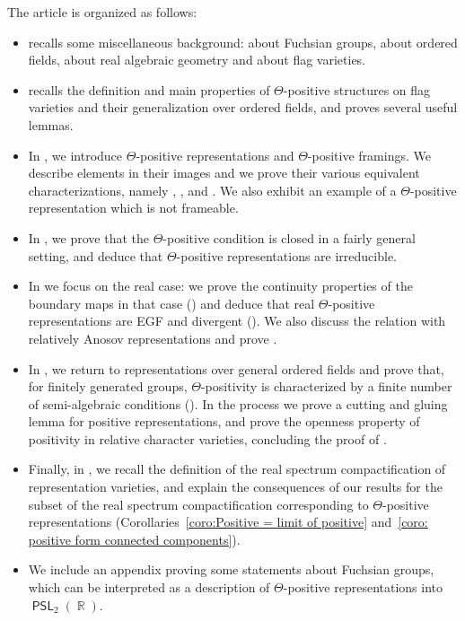 \documentclass{amsart}
\theoremstyle{plain}
\theoremstyle{definition}
\DeclareMathOperator{\PSL}{\mathsf{PSL}}
\DeclareMathOperator{\Rb}{{\mathbb{R}}}
\newcommand{\1}{\mathbf{1}}
\begin{document}
The article is organized as follows:
\begin{itemize}
    \item {} recalls some miscellaneous background: about Fuchsian groups, about ordered fields, about real algebraic geometry and about flag varieties.

    \item {} recalls the definition and main properties of $\Theta$-positive structures on flag varieties and their generalization over ordered fields, and proves several useful lemmas.

    \item In , we introduce $\Theta$-positive representations and $\Theta$-positive framings. We describe elements in their images and we prove their various equivalent characterizations, namely , , and . We also exhibit an example of a $\Theta$-positive representation which is not frameable.
   
    \item In , we prove that the $\Theta$-positive condition is closed in a fairly general setting, and deduce that $\Theta$-positive representations are irreducible.

    \item In  we focus on the real case: we prove the continuity properties of the boundary maps in that case () and deduce that real $\Theta$-positive representations are EGF and divergent (). We also discuss the relation with relatively Anosov representations and prove .

    \item In , we return to representations over general ordered fields and prove that, for finitely generated groups, $\Theta$-positivity is characterized by a finite number of semi-algebraic conditions (). In the process  we prove a cutting and gluing lemma for positive representations, and prove the openness property of positivity in relative character varieties, concluding the proof of .

    \item Finally, in , we recall the definition of the real spectrum compactification of representation varieties, and explain the consequences of our results for the subset of the real spectrum compactification corresponding to $\Theta$-positive representations (Corollaries~\ref{coro:Positive = limit of positive} and~\ref{coro: positive form connected components}).

    \item We include an appendix proving some statements about Fuchsian groups, which can be interpreted as a description of $\Theta$-positive representations into $\PSL_2(\Rb)$.
\end{itemize}
\end{document}
